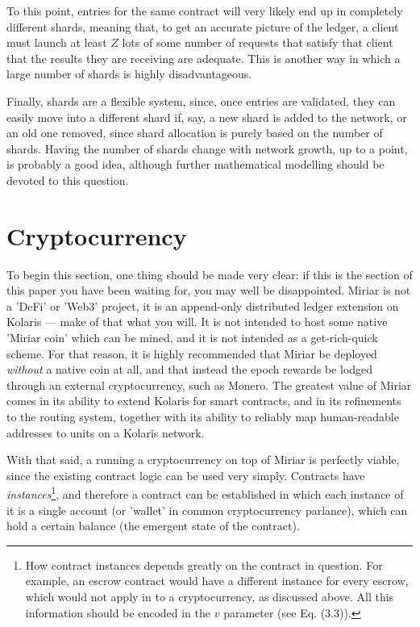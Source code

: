 \documentclass{extreport}
\begin{document}
To this point, entries for the same contract will very likely end up in completely different shards, meaning that, to get an accurate picture of the ledger, a client must launch at least \(Z\) lots of some number of requests that satisfy that client that the results they are receiving are adequate. This is another way in which a large number of shards is highly disadvantageous.

Finally, shards are a flexible system, since, once entries are validated, they can easily move into a different shard if, say, a new shard is added to the network, or an old one removed, since shard allocation is purely based on the number of shards. Having the number of shards change with network growth, up to a point, is probably a good idea, although further mathematical modelling should be devoted to this question.

\chapter{Cryptocurrency}
\label{sec:org7b7ddbf}

To begin this section, one thing should be made very clear: if this is the section of this paper you have been waiting for, you may well be disappointed. Miriar is not a 'DeFi' or 'Web3' project, it is an append-only distributed ledger extension on Kolaris --- make of that what you will. It is not intended to host some native 'Miriar coin' which can be mined, and it is not intended as a get-rich-quick scheme. For that reason, it is highly recommended that Miriar be deployed \emph{without} a native coin at all, and that instead the epoch rewards be lodged through an external cryptocurrency, such as Monero. The greatest value of Miriar comes in its ability to extend Kolaris for smart contracts, and in its refinements to the routing system, together with its ability to reliably map human-readable addresses to units on a Kolaris network.

With that said, a running a cryptocurrency on top of Miriar is perfectly viable, since the existing contract logic can be used very simply. Contracts have \emph{instances}\footnote{How contract instances depends greatly on the contract in question. For example, an escrow contract would have a different instance for every escrow, which would not apply in to a cryptocurrency, as discussed above. All this information should be encoded in the \(v\) parameter (see Eq. (3.3)).}, and therefore a contract can be established in which each instance of it is a single account (or 'wallet' in common cryptocurrency parlance), which can hold a certain balance (the emergent state of the contract).
\end{document}
